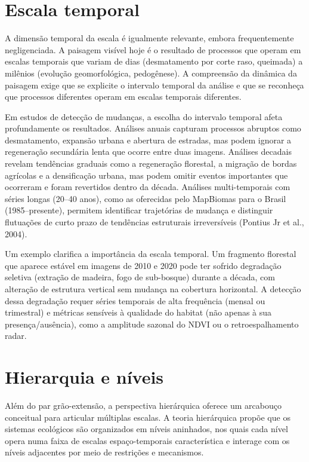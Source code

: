 \documentclass[
  portuguese,
  11pt,
  a4paper,
  open=any]{scrbook}
\begin{document}
\section{Escala temporal}\label{escala-temporal}

A dimensão temporal da escala é igualmente relevante, embora
frequentemente negligenciada. A paisagem visível hoje é o resultado de
processos que operam em escalas temporais que variam de dias
(desmatamento por corte raso, queimada) a milênios (evolução
geomorfológica, pedogênese). A compreensão da dinâmica da paisagem exige
que se explicite o intervalo temporal da análise e que se reconheça que
processos diferentes operam em escalas temporais diferentes.

Em estudos de detecção de mudanças, a escolha do intervalo temporal
afeta profundamente os resultados. Análises anuais capturam processos
abruptos como desmatamento, expansão urbana e abertura de estradas, mas
podem ignorar a regeneração secundária lenta que ocorre entre duas
imagens. Análises decadais revelam tendências graduais como a
regeneração florestal, a migração de bordas agrícolas e a densificação
urbana, mas podem omitir eventos importantes que ocorreram e foram
revertidos dentro da década. Análises multi-temporais com séries longas
(20--40 anos), como as oferecidas pelo MapBiomas para o Brasil
(1985--presente), permitem identificar trajetórias de mudança e
distinguir flutuações de curto prazo de tendências estruturais
irreversíveis (Pontius Jr et al., 2004).

Um exemplo clarifica a importância da escala temporal. Um fragmento
florestal que aparece estável em imagens de 2010 e 2020 pode ter sofrido
degradação seletiva (extração de madeira, fogo de sub-bosque) durante a
década, com alteração de estrutura vertical sem mudança na cobertura
horizontal. A detecção dessa degradação requer séries temporais de alta
frequência (mensal ou trimestral) e métricas sensíveis à qualidade do
habitat (não apenas à sua presença/ausência), como a amplitude sazonal
do NDVI ou o retroespalhamento radar.

\section{Hierarquia e níveis}\label{hierarquia-e-nuxedveis}

Além do par grão-extensão, a perspectiva hierárquica oferece um
arcabouço conceitual para articular múltiplas escalas. A teoria
hierárquica propõe que os sistemas ecológicos são organizados em níveis
aninhados, nos quais cada nível opera numa faixa de escalas
espaço-temporais característica e interage com os níveis adjacentes por
meio de restrições e mecanismos.
\end{document}
